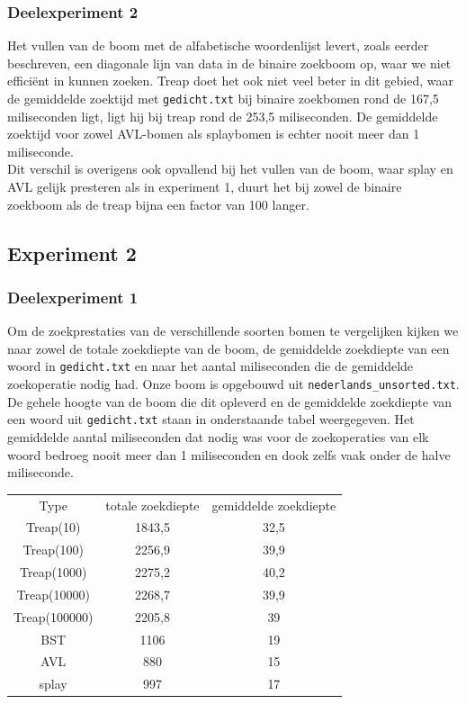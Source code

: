 \documentclass[a4paper,10pt]{article}
\begin{document}
\subsubsection{Deelexperiment 2}
Het vullen van de boom met de alfabetische woordenlijst levert, zoals eerder beschreven, een diagonale lijn van data in de binaire zoekboom op, waar we niet efficiënt in kunnen zoeken. Treap doet het ook niet veel beter in dit gebied, waar de gemiddelde zoektijd met \texttt{gedicht.txt} bij binaire zoekbomen rond de 167,5 miliseconden ligt, ligt hij bij treap rond de 253,5 miliseconden. De gemiddelde zoektijd voor zowel AVL-bomen als splaybomen is echter nooit meer dan 1 miliseconde. \\
Dit verschil is overigens ook opvallend bij het vullen van de boom, waar splay en AVL gelijk presteren als in experiment 1, duurt het bij zowel de binaire zoekboom als de treap bijna een factor van 100 langer.

\subsection{Experiment 2}
\subsubsection{Deelexperiment 1}
Om de zoekprestaties van de verschillende soorten bomen te vergelijken kijken we naar zowel de totale zoekdiepte van de boom, de gemiddelde zoekdiepte van een woord in \texttt{gedicht.txt} en naar het aantal miliseconden die de gemiddelde zoekoperatie nodig had. Onze boom is opgebouwd uit \texttt{nederlands\_unsorted.txt}.
De gehele hoogte van de boom die dit opleverd en de gemiddelde zoekdiepte van een woord uit \texttt{gedicht.txt} staan in onderstaande tabel weergegeven. Het gemiddelde aantal miliseconden dat nodig was voor de zoekoperaties van elk woord bedroeg nooit meer dan 1 miliseconden en dook zelfs vaak onder de halve miliseconde.

\begin{center}
\begin{tabular}{c c c}
Type & totale zoekdiepte & gemiddelde zoekdiepte \\
Treap(10) & 1843,5 & 32,5 \\
Treap(100) & 2256,9 & 39,9 \\
Treap(1000) & 2275,2 & 40,2 \\
Treap(10000) & 2268,7 & 39,9 \\
Treap(100000) & 2205,8 & 39 \\
BST & 1106 & 19 \\
AVL & 880 & 15 \\
splay & 997 & 17 \\
\end{tabular}
\end{center}
\end{document}
